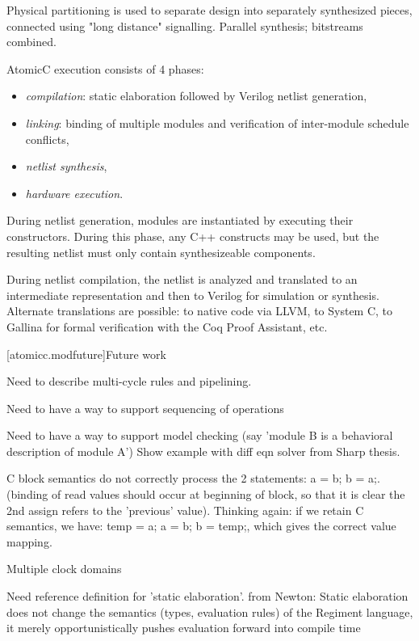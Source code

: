 Physical partitioning is used to separate design into separately synthesized pieces, connected using
"long distance" signalling.  Parallel synthesis; bitstreams combined.

AtomicC execution consists of 4 phases:
\begin{itemize}
\item \textit{compilation}: static elaboration followed by Verilog netlist generation, 
\item \textit{linking}: binding of multiple modules and verification of inter-module schedule conflicts,
\item \textit{netlist synthesis},
\item \textit{hardware execution}.
\end{itemize}

During netlist
generation, modules are instantiated by executing their
constructors. During this phase, any C++ constructs may be used, but
the resulting netlist must only contain synthesizeable components.

During netlist compilation, the netlist is analyzed and translated to
an intermediate representation and then to Verilog for simulation or
synthesis. Alternate translations are possible: to native code via
LLVM, to System C, to Gallina for formal verification with the Coq
Proof Assistant, etc.

[atomicc.modfuture]{Future work}

Need to describe multi-cycle rules and pipelining.

Need to have a way to support sequencing of operations

Need to have a way to support model checking (say 'module B is a behavioral description of module A')
Show example with diff eqn solver from Sharp thesis.

C block semantics do not correctly process the 2 statements: a = b; b = a;.
(binding of read values should occur at beginning of block, so that it is clear the
2nd assign refers to the 'previous' value).
Thinking again: if we retain C semantics, we have: temp = a; a = b; b = temp;, which
gives the correct value mapping.

Multiple clock domains

Need reference definition for 'static elaboration'.
from Newton: 
Static elaboration does not change the semantics (types, evaluation rules) of the
Regiment language, it merely opportunistically pushes evaluation forward into compile time
